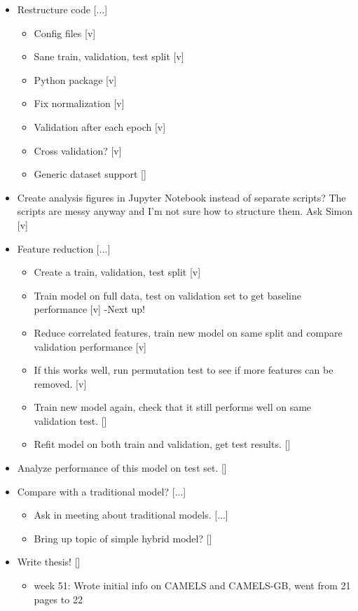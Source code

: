 \begin{itemize}
\item Restructure code [...] \begin{itemize}
\item Config files [v]
\item Sane train, validation, test split [v]
\item Python package [v]
\item Fix normalization [v]
\item Validation after each epoch [v]
\item Cross validation? [v]
\item Generic dataset support []
\end{itemize}
\item Create analysis figures in Jupyter Notebook instead of separate scripts?
The scripts are messy anyway and I'm not sure how to structure them. Ask Simon [v]
\item Feature reduction [...]
\begin{itemize}
\item Create a train, validation, test split [v]
\item Train model on full data, test on validation set to get baseline performance [v] -Next up!
\item Reduce correlated features, train new model on same split and compare validation performance [v]
\item If this works well, run permutation test to see if more features can be removed. [v]
\item Train new model again, check that it still performs well on same validation test. []
\item Refit model on both train and validation, get test results.  []
\end{itemize}
\item Analyze performance of this model on test set. []
\item Compare with a traditional model? [...]
    \begin{itemize}
        \item Ask in meeting about traditional models. [...]
        \item Bring up topic of simple hybrid model? []
    \end{itemize}
\item Write thesis! []
    \begin{itemize}
        \item week 51: Wrote initial info on CAMELS and CAMELS-GB, went from 21 pages to 22
    \end{itemize}
\end{itemize}
